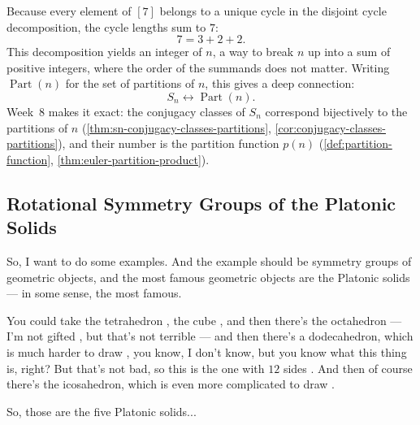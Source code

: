 \begin{content}
\begin{center}
\end{center}

Because every element of $[7]$ belongs to a unique cycle in the disjoint cycle decomposition, the cycle lengths sum to $7$:
\[
7 = 3 + 2 + 2.
\]
This decomposition yields an integer  of $n$, a way to break $n$ up into a sum of positive integers, where the order of the summands does not matter. Writing $\operatorname{Part}(n)$ for the set of partitions of $n$, this gives a deep connection:
\[
S_n \longleftrightarrow \operatorname{Part}(n).
\]
Week~8 makes it exact: the conjugacy classes of $S_n$ correspond bijectively to the partitions of $n$ (\cref{thm:sn-conjugacy-classes-partitions}, \cref{cor:conjugacy-classes-partitions}), and their number is the partition function $p(n)$ (\cref{def:partition-function}, \cref{thm:euler-partition-product}).
\end{content}

\subsection{Rotational Symmetry Groups of the Platonic Solids}

\begin{speech}[00:32:34 - 00:33:22]
So, I want to do some examples. And the example should be symmetry groups of geometric objects, and the most famous geometric objects are the Platonic solids --- in some sense, the most famous.

You could take the tetrahedron , the cube , and then there's the octahedron --- I'm not gifted , but that's not terrible --- and then there's a dodecahedron, which is much harder to draw , you know, I don't know, but you know what this thing is, right? But that's not bad, so this is the one with $12$ sides . And then of course there's the icosahedron, which is even more complicated to draw .

So, those are the five Platonic solids...
\end{speech}

